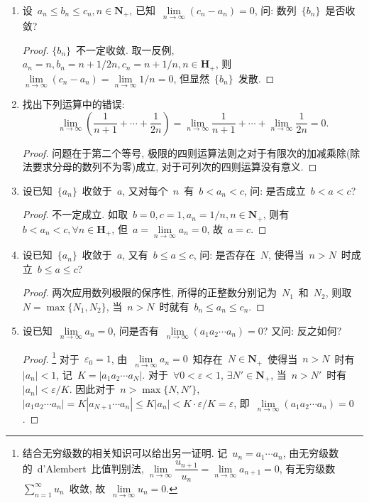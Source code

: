 \documentclass[UTF8,a4paper,10pt,twoside]{book}
\begin{document}
\begin{enumerate}
\begin{proof}
		      $\{a_nb_n\}$~可能发散也可能收敛. 如取~$a_n=b_n=(-1)^n$, 则~$a_nb_n=1$, $\{a_nb_n\}$~收敛; 取~$a_n=(-1)^n, b_n=n$, 则~$a_nb_n=(-1)^n\cdot n$, $\{a_nb_n\}$~发散.\qedhere
	      \end{proof}
	\item 设~$a_n\leqslant b_n\leqslant c_n, n\in\mathbf{N}_{+}$, 已知~$\lim\limits_{n\to\infty} (c_n-a_n)=0$, 问: 数列~$\{b_n\}$~是否收敛?
	      \begin{proof}
		      $\{b_n\}$~不一定收敛. 取一反例, $a_n=n, b_n=n+1/2n, c_n=n+1/n, n\in\mathbf{H}_{+}$, 则~$\lim\limits_{n\to\infty} (c_n-a_n)=\lim\limits_{n\to\infty} 1/n=0$, 但显然~$\{b_n\}$~发散.\qedhere
	      \end{proof}
	\item 找出下列运算中的错误:
	      \[
		      \lim\limits_{n\to\infty} \left(\dfrac{1}{n+1}+\cdots+\dfrac{1}{2n}\right)=\lim\limits_{n\to\infty}\dfrac{1}{n+1}+\cdots+\lim\limits_{n\to\infty}\dfrac{1}{2n}=0.
	      \]
	      \begin{proof}
		      问题在于第二个等号, 极限的四则运算法则之对于有限次的加减乘除(除法要求分母的数列不为零)成立, 对于可列次的四则运算没有意义.\qedhere
	      \end{proof}
	\item 设已知~$\{a_n\}$~收敛于~$a$, 又对每个~$n$~有~$b<a_n<c$, 问: 是否成立~$b<a<c$?
	      \begin{proof}
		      不一定成立. 如取~$b=0, c=1, a_n=1/n, n\in\mathbf{N}_{+}$, 则有~$b<a_n<c, \forall n\in\mathbf{H}_{+}$, 但~$a=\lim\limits_{n\to\infty} a_n=0$, 故~$a=c$.\qedhere
	      \end{proof}
	\item 设已知~$\{a_n\}$~收敛于~$a$, 又有~$b\leqslant a\leqslant c$, 问: 是否存在~$N$, 使得当~$n>N$~时成立~$b\leqslant a\leqslant c$?
	      \begin{proof}
		      两次应用数列极限的保序性, 所得的正整数分别记为~$N_1$~和~$N_2$, 则取~$N=\max\{N_1,N_2\}$, 当~$n>N$~时就有~$b_n\leqslant a_n\leqslant c_n$.\qedhere
	      \end{proof}
	\item 设已知~$\lim\limits_{n\to\infty} a_n=0$, 问是否有~$\lim\limits_{n\to\infty} (a_1a_2\cdots a_n)=0$? 又问: 反之如何?
	      \begin{proof}\footnote{结合无穷级数的相关知识可以给出另一证明. 记~$u_n=a_1\cdots a_n$, 由无穷级数的~d'Alembert~比值判别法, $\lim\limits_{n\to\infty} \dfrac{u_{n+1}}{u_n}=\lim\limits_{n\to\infty} a_{n+1}=0$, 有无穷级数~$\sum\limits_{n=1}^{\infty}u_n$~收敛, 故~$\lim\limits_{n\to\infty} u_n=0$.}
		      对于~$\varepsilon_0=1$, 由~$\lim\limits_{n\to\infty} a_n=0$~知存在~$N\in\mathbf{N}_{+}$~使得当~$n>N$~时有~$|a_n|<1$, 记~$K=|a_1a_2\cdots a_N|$. 对于~$\forall 0<\varepsilon<1$, $\exists N'\in\mathbf{N}_{+}$, 当~$n>N'$~时有~$|a_n|<\varepsilon/K$. 因此对于~$n>\max\{N,N'\}$, $|a_1a_2\cdots a_n|=K|a_{N+1}\cdots a_n|\leqslant K|a_n|<K\cdot\varepsilon/K=\varepsilon$, 即~$\lim\limits_{n\to\infty} (a_1a_2\cdots a_n)=0$.\qedhere
	      \end{proof}
\end{enumerate}
\end{document}
